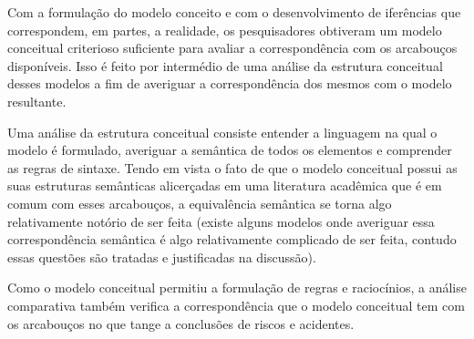 Com a formulação do modelo conceito e com o desenvolvimento de iferências que correspondem, em partes, a realidade, os pesquisadores obtiveram um modelo conceitual criterioso suficiente para avaliar a correspondência com os arcabouços disponíveis. Isso é feito por intermédio de uma análise da estrutura conceitual desses modelos a fim de averiguar a correspondência dos mesmos com o modelo resultante.

Uma análise da estrutura conceitual consiste entender a linguagem na qual o modelo é formulado, averiguar a semântica de todos os elementos e comprender as regras de sintaxe. Tendo em vista o fato de que o modelo conceitual possui as suas estruturas semânticas alicerçadas em uma literatura acadêmica que é em comum com esses arcabouços, a equivalência semântica se torna algo relativamente notório de ser feita (existe alguns modelos onde averiguar essa correspondência semântica é algo relativamente complicado de ser feita, contudo essas questões são tratadas e justificadas na discussão).

Como o modelo conceitual permitiu a formulação de regras e raciocínios, a análise comparativa também verifica a correspondência que o modelo conceitual tem com os arcabouços no que tange a conclusões de riscos e acidentes.
